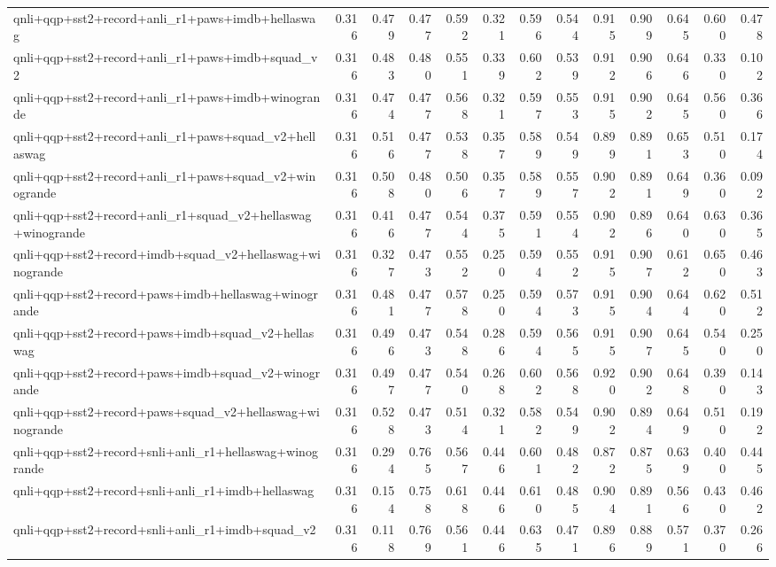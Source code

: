 \begin{table}[t]
\begin{tabular}{lrrrrrrrrrrrr}
    qnli+qqp+sst2+record+anli\_r1+paws+imdb+hellaswag & 0.316 & 0.479 & 0.477 & 0.592 & 0.321 & 0.596 & 0.544 & 0.915 & 0.909 & 0.645 & 0.600 & 0.478 \\
    qnli+qqp+sst2+record+anli\_r1+paws+imdb+squad\_v2 & 0.316 & 0.483 & 0.480 & 0.551 & 0.339 & 0.602 & 0.539 & 0.912 & 0.906 & 0.646 & 0.330 & 0.102 \\
    qnli+qqp+sst2+record+anli\_r1+paws+imdb+winogrande & 0.316 & 0.474 & 0.477 & 0.568 & 0.321 & 0.597 & 0.553 & 0.915 & 0.902 & 0.645 & 0.560 & 0.366 \\
    qnli+qqp+sst2+record+anli\_r1+paws+squad\_v2+hellaswag & 0.316 & 0.516 & 0.477 & 0.538 & 0.357 & 0.589 & 0.549 & 0.899 & 0.891 & 0.653 & 0.510 & 0.174 \\
    qnli+qqp+sst2+record+anli\_r1+paws+squad\_v2+winogrande & 0.316 & 0.508 & 0.480 & 0.506 & 0.357 & 0.589 & 0.557 & 0.902 & 0.891 & 0.649 & 0.360 & 0.092 \\
    qnli+qqp+sst2+record+anli\_r1+squad\_v2+hellaswag+winogrande & 0.316 & 0.416 & 0.477 & 0.544 & 0.375 & 0.591 & 0.554 & 0.902 & 0.896 & 0.640 & 0.630 & 0.365 \\
    qnli+qqp+sst2+record+imdb+squad\_v2+hellaswag+winogrande & 0.316 & 0.327 & 0.473 & 0.552 & 0.250 & 0.594 & 0.552 & 0.915 & 0.907 & 0.612 & 0.650 & 0.463 \\
    qnli+qqp+sst2+record+paws+imdb+hellaswag+winogrande & 0.316 & 0.481 & 0.477 & 0.578 & 0.250 & 0.594 & 0.573 & 0.915 & 0.904 & 0.644 & 0.620 & 0.512 \\
    qnli+qqp+sst2+record+paws+imdb+squad\_v2+hellaswag & 0.316 & 0.496 & 0.473 & 0.548 & 0.286 & 0.594 & 0.565 & 0.915 & 0.907 & 0.645 & 0.540 & 0.250 \\
    qnli+qqp+sst2+record+paws+imdb+squad\_v2+winogrande & 0.316 & 0.497 & 0.477 & 0.540 & 0.268 & 0.602 & 0.568 & 0.920 & 0.902 & 0.648 & 0.390 & 0.143 \\
    qnli+qqp+sst2+record+paws+squad\_v2+hellaswag+winogrande & 0.316 & 0.528 & 0.473 & 0.514 & 0.321 & 0.582 & 0.549 & 0.902 & 0.894 & 0.649 & 0.510 & 0.192 \\
    qnli+qqp+sst2+record+snli+anli\_r1+hellaswag+winogrande & 0.316 & 0.294 & 0.765 & 0.567 & 0.446 & 0.601 & 0.482 & 0.872 & 0.875 & 0.639 & 0.400 & 0.445 \\
    qnli+qqp+sst2+record+snli+anli\_r1+imdb+hellaswag & 0.316 & 0.154 & 0.758 & 0.618 & 0.446 & 0.610 & 0.485 & 0.904 & 0.891 & 0.566 & 0.430 & 0.462 \\
    qnli+qqp+sst2+record+snli+anli\_r1+imdb+squad\_v2 & 0.316 & 0.118 & 0.769 & 0.561 & 0.446 & 0.635 & 0.471 & 0.896 & 0.889 & 0.571 & 0.370 & 0.266 \\

\end{tabular}
\end{table}

